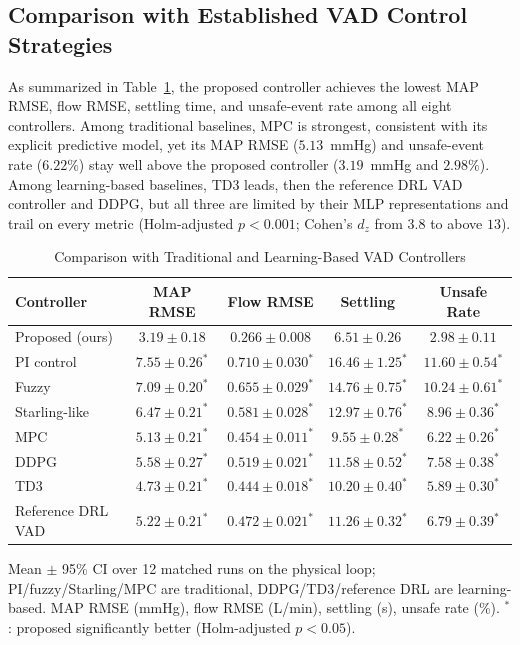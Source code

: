 \documentclass[sigconf]{acmart}
\begin{document}
\subsection{Comparison with Established VAD Control Strategies}
As summarized in Table~\ref{tab:extended_baseline_results}, the proposed controller achieves the lowest MAP RMSE, flow RMSE, settling time, and unsafe-event rate among all eight controllers. Among traditional baselines, MPC is strongest, consistent with its explicit predictive model, yet its MAP RMSE ($5.13$~mmHg) and unsafe-event rate ($6.22\%$) stay well above the proposed controller ($3.19$~mmHg and $2.98\%$). Among learning-based baselines, TD3 leads, then the reference DRL VAD controller and DDPG, but all three are limited by their MLP representations and trail on every metric (Holm-adjusted $p<0.001$; Cohen's $d_z$ from $3.8$ to above $13$).

\begin{table}[!t]
\caption{Comparison with Traditional and Learning-Based VAD Controllers}
\label{tab:extended_baseline_results}
\centering
\footnotesize
\setlength{\tabcolsep}{3pt}
\begin{tabular}{lcccc}
\toprule
\textbf{Controller} & \textbf{MAP RMSE} & \textbf{Flow RMSE} & \textbf{Settling} & \textbf{Unsafe Rate} \\
\midrule
Proposed (ours) & $3.19 \pm 0.18$ & $0.266 \pm 0.008$ & $6.51 \pm 0.26$ & $2.98 \pm 0.11$ \\
\midrule
PI control & $7.55 \pm 0.26^{*}$ & $0.710 \pm 0.030^{*}$ & $16.46 \pm 1.25^{*}$ & $11.60 \pm 0.54^{*}$ \\
Fuzzy & $7.09 \pm 0.20^{*}$ & $0.655 \pm 0.029^{*}$ & $14.76 \pm 0.75^{*}$ & $10.24 \pm 0.61^{*}$ \\
Starling-like & $6.47 \pm 0.21^{*}$ & $0.581 \pm 0.028^{*}$ & $12.97 \pm 0.76^{*}$ & $8.96 \pm 0.36^{*}$ \\
MPC & $5.13 \pm 0.21^{*}$ & $0.454 \pm 0.011^{*}$ & $9.55 \pm 0.28^{*}$ & $6.22 \pm 0.26^{*}$ \\
DDPG & $5.58 \pm 0.27^{*}$ & $0.519 \pm 0.021^{*}$ & $11.58 \pm 0.52^{*}$ & $7.58 \pm 0.38^{*}$ \\
TD3 & $4.73 \pm 0.21^{*}$ & $0.444 \pm 0.018^{*}$ & $10.20 \pm 0.40^{*}$ & $5.89 \pm 0.30^{*}$ \\
Reference DRL VAD & $5.22 \pm 0.21^{*}$ & $0.472 \pm 0.021^{*}$ & $11.26 \pm 0.32^{*}$ & $6.79 \pm 0.39^{*}$ \\
\bottomrule
\end{tabular}
\par\smallskip
{\scriptsize Mean $\pm$ 95\% CI over 12 matched runs on the physical loop; PI/fuzzy/Starling/MPC are traditional, DDPG/TD3/reference DRL are learning-based. MAP RMSE (mmHg), flow RMSE (L/min), settling (s), unsafe rate (\%). $^{*}$: proposed significantly better (Holm-adjusted $p<0.05$).\par}
\end{table}
\end{document}
